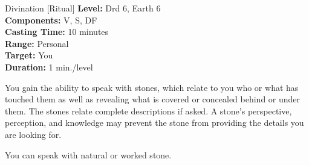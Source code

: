 {Divination [Ritual]}
{
	\textbf{Level:}
	Drd 6, Earth 6\\
	\textbf{Components:}
	V, S, DF\\
	\textbf{Casting Time:}
	10 minutes\\
	\textbf{Range:}
	Personal\\
	\textbf{Target:}
	You\\
	\textbf{Duration:}
	1 min./level\\
}
{
	You gain the ability to speak with stones, which relate to you who or what has touched them as well as revealing what is covered or concealed behind or under them. The stones relate complete descriptions if asked. A stone's perspective, perception, and knowledge may prevent the stone from providing the details you are looking for.

	You can speak with natural or worked stone.

}
